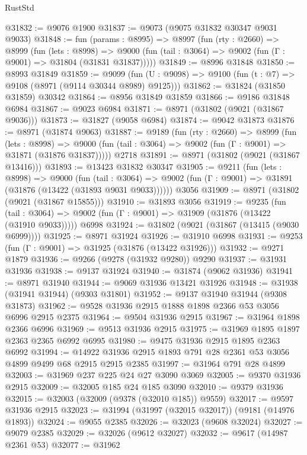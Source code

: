 \begin{lexlean}{RustStd}
\begin{coremodule}
@31832 := @9076 @1900
@31837 := @9073 (@9075 @31832 @30347 @9031 @9033)
@31848 := fun (params : @8995) =>
  @8997
    (fun (rty : @2660) =>
    @8999
      (fun (lets : @8998) =>
      @9000 (fun (tail : @3064) => @9002 (fun (Γ : @9001) => @31804 (@31831 @31837)))))
@31849 := @8996 @31848
@31850 := @8993 @31849
@31859 := @9099
    (fun (U : @9098) => @9100 (fun (t : @7) => @9108 (@8971 (@9114 @30344 @8989) @9125)))
@31862 := @31824 (@31850 @31859) @30342
@31864 := @8956 @31849 @31859
@31866 := @9186 @31848 @6984
@31867 := @9023 @6984
@31871 := @8971 (@31802 (@9021 (@31867 @9036)))
@31873 := @31827 (@9058 @6984)
@31874 := @9042 @31873
@31876 := @8971 (@31874 @9063)
@31887 := @9189
    (fun (rty : @2660) =>
    @8999
      (fun (lets : @8998) =>
      @9000 (fun (tail : @3064) => @9002 (fun (Γ : @9001) => @31871 (@31876 @31837)))))
    @2718
@31891 := @8971 (@31802 (@9021 (@31867 @13416)))
@31893 := @13423 @31832 @30347
@31905 := @9211
    (fun (lets : @8998) =>
    @9000
      (fun (tail : @3064) =>
      @9002 (fun (Γ : @9001) => @31891 (@31876 (@13422 (@31893 @9031 @9033))))))
    @3056
@31909 := @8971 (@31802 (@9021 (@31867 @15855)))
@31910 := @31893 @3056
@31919 := @9235
    (fun (tail : @3064) => @9002 (fun (Γ : @9001) => @31909 (@31876 (@13422 (@31910 @9033)))))
    @6998
@31924 := @31802 (@9021 (@31867 (@13415 (@9030 @6999))))
@31925 := @8971 @31924
@31926 := @31910 @6998
@31931 := @9253 (fun (Γ : @9001) => @31925 (@31876 (@13422 @31926)))
@31932 := @9271 @1879
@31936 := @9266 (@9278 (@31932 @9280)) @9290
@31937 := @31931 @31936
@31938 := @9137 @31924
@31940 := @31874 (@9062 @31936)
@31941 := @8971 @31940
@31944 := @9069 @31936 @13421 @31926
@31948 := @31938 (@31941 @31944) (@9303 @31801)
@31952 := @9137 @31940 @31944 (@9308 @31873)
@31962 := @9528 @31936 @2915 @1888 @1898 @2366 @53 @3056 @6996 @2915 @2375
@31964 := @9504 @31936 @2915
@31967 := @31964 @1898 @2366 @6996
@31969 := @9513 @31936 @2915
@31975 := @31969 @1895 @1897 @2363 @2365 @6992 @6995
@31980 := @9475 @31936 @2915 @1895 @2363 @6992
@31994 := @14922 @31936 @2915 @1893 @791 @28 @2361 @53 @3056 @4899 @9499 @68 @2915 @2915 @2385
@31997 := @31964 @791 @28 @4899
@32003 := @31969 @237 @225 @24 @27 @3090 @3069
@32005 := @9370 @31936 @2915
@32009 := @32005 @185 @24 @185 @3090
@32010 := @9379 @31936
@32015 := @32003 (@32009 (@9378 (@32010 @185)) @9559)
@32017 := @9597 @31936 @2915
@32023 := @31994 (@31997 (@32015 @32017)) (@9181 (@14976 @1893))
@32024 := @9055 @2385
@32026 := @32023 (@9608 @32024)
@32027 := @9079 @2385
@32029 := @32026 (@9612 @32027)
@32032 := @9617 (@14987 @2361 @53)
@32077 := @31962

\end{coremodule}
\end{lexlean}

